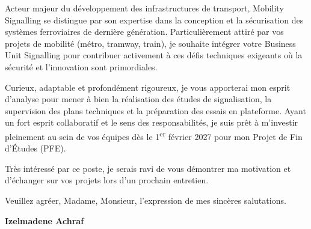 \documentclass[10pt,a4paper]{altacv}
\begin{document}
\vspace{0.4cm}

Acteur majeur du développement des infrastructures de transport, Mobility Signalling se distingue par son expertise dans la conception et la sécurisation des systèmes ferroviaires de dernière génération. Particulièrement attiré par vos projets de mobilité (métro, tramway, train), je souhaite intégrer votre Business Unit Signalling pour contribuer activement à ces défis techniques exigeants où la sécurité et l'innovation sont primordiales.

\vspace{0.4cm}

Curieux, adaptable et profondément rigoureux, je vous apporterai mon esprit d'analyse pour mener à bien la réalisation des études de signalisation, la supervision des plans techniques et la préparation des essais en plateforme. Ayant un fort esprit collaboratif et le sens des responsabilités, je suis prêt à m'investir pleinement au sein de vos équipes dès le 1\textsuperscript{er} février 2027 pour mon Projet de Fin d'Études (PFE).

\vspace{0.4cm}

Très intéressé par ce poste, je serais ravi de vous démontrer ma motivation et d'échanger sur vos projets lors d'un prochain entretien.

\vspace{0.5cm}

Veuillez agréer, Madame, Monsieur, l'expression de mes sincères salutations.

\vfill

\begin{flushright}
  \Large\color{emphasis}\textbf{Izelmadene Achraf}
\end{flushright}
\end{document}
